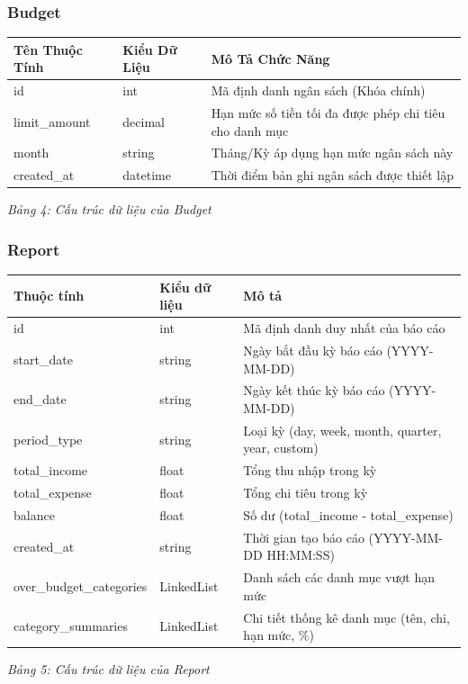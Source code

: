 \documentclass[12pt,letterpaper]{article}
\begin{document}
\subsubsection{Budget}
\begin{center}
    \begin{tabular}{|l|l|p{8.5cm}|}
        \hline
        \textbf{Tên Thuộc Tính} & \textbf{Kiểu Dữ Liệu} & \textbf{Mô Tả Chức Năng} \\ \hline
        id & int & Mã định danh ngân sách (Khóa chính) \\ \hline
        limit\_amount & decimal & Hạn mức số tiền tối đa được phép chi tiêu cho danh mục \\ \hline
        month & string & Tháng/Kỳ áp dụng hạn mức ngân sách này \\ \hline
        created\_at & datetime & Thời điểm bản ghi ngân sách được thiết lập \\ \hline
    \end{tabular}
    
    \vspace{0.2cm}
    \textit{Bảng 4: Cấu trúc dữ liệu của Budget}
\end{center}
\subsubsection{Report}
\begin{center}
 \begin{tabular}{|l|l|p{8.5cm}|}
        \hline
        \textbf{Thuộc tính} & \textbf{Kiểu dữ liệu} & \textbf{Mô tả} \\
        \hline
        id & int & Mã định danh duy nhất của báo cáo \\ \hline
        start\_date & string & Ngày bắt đầu kỳ báo cáo (YYYY-MM-DD) \\ \hline
        end\_date & string & Ngày kết thúc kỳ báo cáo (YYYY-MM-DD) \\ \hline
        period\_type & string & Loại kỳ (day, week, month, quarter, year, custom) \\ \hline
        total\_income & float & Tổng thu nhập trong kỳ \\ \hline
        total\_expense & float & Tổng chi tiêu trong kỳ \\ \hline
        balance & float & Số dư (total\_income - total\_expense) \\ \hline
        created\_at & string & Thời gian tạo báo cáo (YYYY-MM-DD HH:MM:SS) \\ \hline
        over\_budget\_categories & LinkedList & Danh sách các danh mục vượt hạn mức \\ \hline
        category\_summaries & LinkedList & Chi tiết thống kê danh mục (tên, chi, hạn mức, \%) \\ \hline
    \end{tabular}
    
    \vspace{0.2cm}
    \textit{Bảng 5: Cấu trúc dữ liệu của Report}
\end{center}
\end{document}
